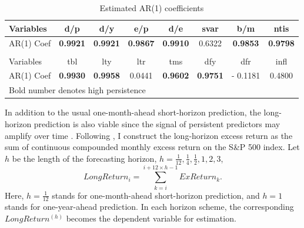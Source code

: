 \documentclass[12pt,a4paper]{article}
\begin{document}
\begin{table}[]\center \small
\caption{Estimated AR(1) coefficients}
\label{tab:4}
\begin{tabular}{lccccccc}
\hline
\multicolumn{1}{|l|}{Variables}  & d/p             & d/y             & e/p             & d/e             & svar   & b/m             & \multicolumn{1}{c|}{ntis}   \\ \hline
\multicolumn{1}{|l|}{AR(1) Coef} & \textbf{0.9921} & \textbf{0.9921} & \textbf{0.9867} & \textbf{0.9910} & 0.6322 & \textbf{0.9853} & \multicolumn{1}{c|}{\textbf{0.9798}} \\ \hline
\multicolumn{8}{l}{}                                                                                                                                              \\ \hline
\multicolumn{1}{|l|}{Variables}  & tbl             & lty             & ltr             & tms             & dfy    & dfr             & \multicolumn{1}{c|}{infl}   \\ \hline
\multicolumn{1}{|l|}{AR(1) Coef} & \textbf{0.9930} & \textbf{0.9958} & 0.0441          & \textbf{0.9602}          & \textbf{0.9751} & - 0.1181        & \multicolumn{1}{c|}{0.4800} \\ \hline
\multicolumn{8}{l}{Bold number denotes high persistence}                                                                                          
\end{tabular}
\end{table}

In addition to the usual one-month-ahead short-horizon prediction, the long-horizon prediction is also viable since the signal of persistent predictors may amplify over time \citep{cochrane2009asset}. Following \cite{lee2018lasso}, I construct the long-horizon excess return as the sum of continuous compounded monthly excess return on the S\&P 500 index. Let $ h $ be the length of the forecasting horizon, $ h = \frac{1}{12}, \frac{1}{4}, \frac{1}{2}, 1, 2, 3 $, 
\begin{equation*}
	LongReturn_i = \sum_{k=i}^{i + 12 \times h - 1} ExReturn_k.
\end{equation*}
Here, $ h = \frac{1}{12} $ stands for one-month-ahead short-horizon prediction, and $ h = 1 $ stands for one-year-ahead prediction. In each horizon scheme, the corresponding $ LongReturn^{(h)} $ becomes the dependent variable for estimation.
\end{document}
